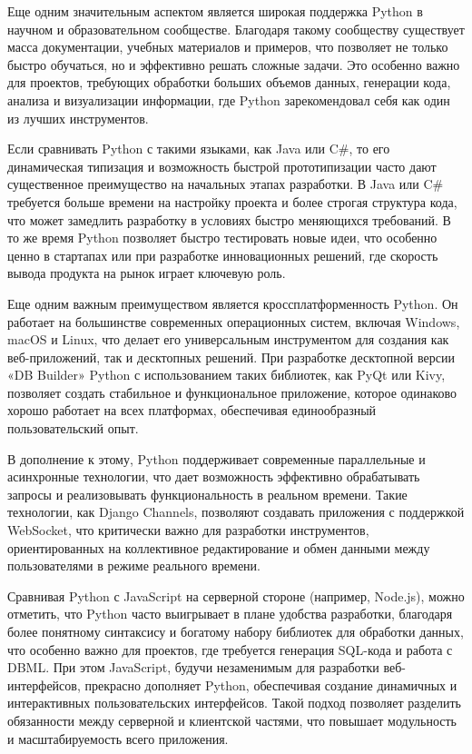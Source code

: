 Еще одним значительным аспектом является широкая поддержка Python в научном и образовательном сообществе. Благодаря такому сообществу существует масса документации, учебных материалов и примеров, что позволяет не только быстро обучаться, но и эффективно решать сложные задачи. Это особенно важно для проектов, требующих обработки больших объемов данных, генерации кода, анализа и визуализации информации, где Python зарекомендовал себя как один из лучших инструментов.

Если сравнивать Python с такими языками, как Java или C\#, то его динамическая типизация и возможность быстрой прототипизации часто дают существенное преимущество на начальных этапах разработки. В Java или C\# требуется больше времени на настройку проекта и более строгая структура кода, что может замедлить разработку в условиях быстро меняющихся требований. В то же время Python позволяет быстро тестировать новые идеи, что особенно ценно в стартапах или при разработке инновационных решений, где скорость вывода продукта на рынок играет ключевую роль.

Еще одним важным преимуществом является кроссплатформенность Python. Он работает на большинстве современных операционных систем, включая Windows, macOS и Linux, что делает его универсальным инструментом для создания как веб-приложений, так и десктопных решений. При разработке десктопной версии «DB Builder» Python с использованием таких библиотек, как PyQt или Kivy, позволяет создать стабильное и функциональное приложение, которое одинаково хорошо работает на всех платформах, обеспечивая единообразный пользовательский опыт.

В дополнение к этому, Python поддерживает современные параллельные и асинхронные технологии, что дает возможность эффективно обрабатывать запросы и реализовывать функциональность в реальном времени. Такие технологии, как Django Channels, позволяют создавать приложения с поддержкой WebSocket, что критически важно для разработки инструментов, ориентированных на коллективное редактирование и обмен данными между пользователями в режиме реального времени.

Сравнивая Python с JavaScript на серверной стороне (например, Node.js), можно отметить, что Python часто выигрывает в плане удобства разработки, благодаря более понятному синтаксису и богатому набору библиотек для обработки данных, что особенно важно для проектов, где требуется генерация SQL-кода и работа с DBML. При этом JavaScript, будучи незаменимым для разработки веб-интерфейсов, прекрасно дополняет Python, обеспечивая создание динамичных и интерактивных пользовательских интерфейсов. Такой подход позволяет разделить обязанности между серверной и клиентской частями, что повышает модульность и масштабируемость всего приложения.

